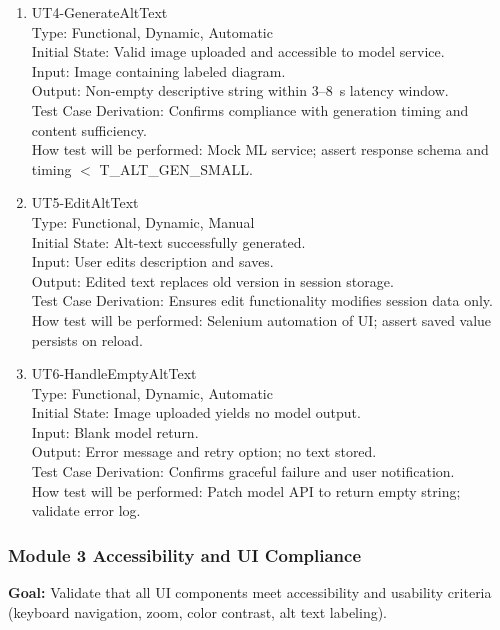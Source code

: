 \documentclass[12pt, titlepage]{article}
\begin{document}
\begin{enumerate}
\item{UT4-GenerateAltText\\}
Type: Functional, Dynamic, Automatic\\
Initial State: Valid image uploaded and accessible to model service.\\
Input: Image containing labeled diagram.\\
Output: Non-empty descriptive string within 3--8~s latency window.\\
Test Case Derivation: Confirms compliance with generation timing and content sufficiency.\\
How test will be performed: Mock ML service; assert response schema and timing $<$ T\_ALT\_GEN\_SMALL.

\item{UT5-EditAltText\\}
Type: Functional, Dynamic, Manual\\
Initial State: Alt-text successfully generated.\\
Input: User edits description and saves.\\
Output: Edited text replaces old version in session storage.\\
Test Case Derivation: Ensures edit functionality modifies session data only.\\
How test will be performed: Selenium automation of UI; assert saved value persists on reload.

\item{UT6-HandleEmptyAltText\\}
Type: Functional, Dynamic, Automatic\\
Initial State: Image uploaded yields no model output.\\
Input: Blank model return.\\
Output: Error message and retry option; no text stored.\\
Test Case Derivation: Confirms graceful failure and user notification.\\
How test will be performed: Patch model API to return empty string; validate error log.
\end{enumerate}

\subsubsection{Module 3 \textemdash{} Accessibility and UI Compliance}

\textbf{Goal:} Validate that all UI components meet accessibility and usability criteria (keyboard navigation, zoom, color contrast, alt text labeling).
\end{document}
